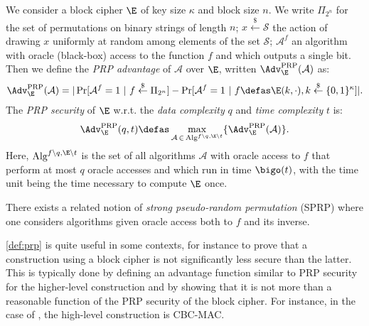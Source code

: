 \begin{defi}
We consider a block cipher $\E$ of key size $\kappa$ and block size $n$.
We write $\Pi_{2^n}$ for the set of permutations on binary strings of length $n$; $x \overset{\$}{\leftarrow} \mathcal{S}$
the action of drawing $x$ uniformly at random among elements of the set $\mathcal{S}$; $\mathcal{A}^{f}$ an algorithm with
oracle (black-box) access to the function $f$ and which outputs a single bit.
Then we define the \emph{PRP advantage} of $\mathcal{A}$ over $\E$, written $\Adv^{\text{PRP}}_{\E}(\mathcal{A})$ as:
\[
\Adv^{\text{PRP}}_{\E}(\mathcal{A}) = |\Pr[\mathcal{A}^f = 1~|~f \overset{\$}{\leftarrow} \Pi_{2^n}] - \Pr[\mathcal{A}^f = 1~|~f \defas \E(k,\cdot), k \overset{\$}{\leftarrow} \{0,1\}^\kappa]|.
\]
The \emph{PRP security} of $\E$ w.r.t. the \emph{data complexity} $q$ and \emph{time complexity} $t$ is:
\[
\Adv^{\text{PRP}}_{\E}(q,t) \defas \max_{\mathcal{A}\,\in\,\text{Alg}^{f\backslash q, \E\backslash t}} \{\Adv^{\text{PRP}}_{\E}(\mathcal{A})\}.
\]
Here, $\text{Alg}^{f\backslash q, \E\backslash t}$ is the set of all algorithms $\mathcal{A}$ with oracle access to $f$ that perform at most $q$ oracle accesses
and which run in time $\bigo(t)$, with the time unit being the time necessary to compute $\E$ once.
\label{def:prp}
\end{defi}
There exists a related notion of \emph{strong pseudo-random permutation} (SPRP) where one considers algorithms given oracle access both to $f$ and its inverse.

\medskip

\autoref{def:prp} is quite useful in some contexts, for instance to prove that a construction using a block cipher is not significantly less secure than the latter. This is
typically done by defining an advantage function similar to PRP security for the higher-level construction  and by showing that
it is not more than a reasonable function of the PRP security of the block cipher.
For instance, in the case of \cite{DBLP:journals/jcss/BellareKR00}, the high-level construction is CBC-MAC.

